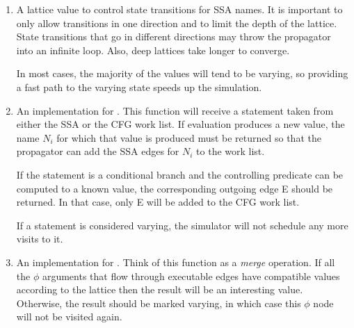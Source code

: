 \begin{enumerate}
\item	A lattice value to control state transitions for SSA
	names.  It is important to only allow transitions in one
	direction and to limit the depth of the lattice.  State
	transitions that go in different directions may throw the
	propagator into an infinite loop.  Also, deep lattices
	take longer to converge.

	In most cases, the majority of the values will tend to be
	varying, so providing a fast path to the varying state
	speeds up the simulation.

\item	An implementation for .  This
	function will receive a statement taken from either the
	SSA or the CFG work list.  If evaluation produces a
	new value, the name $N_i$ for which that value is
	produced must be returned so that the propagator can add
	the SSA edges for $N_i$ to the work list.

	If the statement is a conditional branch and the
	controlling predicate can be computed to a known value,
	the corresponding outgoing edge E should be returned.
	In that case, only E will be added to the CFG work list.

	If a statement is considered varying, the simulator will
	not schedule any more visits to it.

\item	An implementation for .  Think
	of this function as a \textit{merge} operation.  If all
	the $\phi$ arguments that flow through executable edges
	have compatible values according to the lattice then the
	result will be an interesting value.  Otherwise, the
	result should be marked varying, in which case this
	$\phi$ node will not be visited again.
\end{enumerate}



